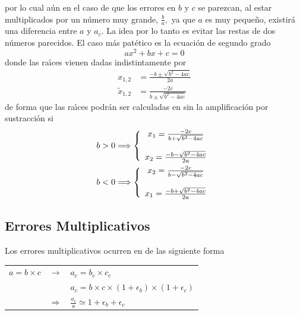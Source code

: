 \documentclass[spanish,titlepage,11pt]{article}
\begin{document}
por lo cual a\'{u}n en el caso de que los errores en $b$ y $c$ se parezcan, al
estar multiplicados por un n\'{u}mero muy grande, $\frac{b}{a},$ ya que $a $
es muy peque\~{n}o, existir\'{a} una diferencia entre $a$ y $a_{c}.$ La idea
por lo tanto es evitar las restas de dos n\'{u}meros parecidos. El caso
m\'{a}s pat\'{e}tico es la ecuaci\'{o}n de segundo grado
\begin{equation}
ax^{2}+bx+c=0
\end{equation}
donde las ra\'{\i}ces vienen dadas indistintamente por
\begin{align}
x_{1,2}  &  =\frac{-b\pm\sqrt{b^{2}-4ac}}{2a}\label{sintilde}\\
\tilde{x}_{1,2}  &  =\frac{-2c}{b\pm\sqrt{b^{2}-4ac}} \label{contilde}%
\end{align}
de forma que las ra\'{\i}ces podr\'{a}n ser calculadas en sin la
amplificaci\'{o}n por sustracci\'{o}n si
\begin{align}
b  &  >0\Longrightarrow\left\{
\begin{array}
[c]{c}%
x_{1}=\frac{-2c}{b+\sqrt{b^{2}-4ac}}\\
\\
x_{2}=\frac{-b-\sqrt{b^{2}-4ac}}{2a}%
\end{array}
\right. \\
b  &  <0\Longrightarrow\left\{
\begin{array}
[c]{c}%
x_{2}=\frac{-2c}{b-\sqrt{b^{2}-4ac}}\\
\\
x_{1}=\frac{-b+\sqrt{b^{2}-4ac}}{2a}%
\end{array}
\right.
\end{align}

\subsection{Errores Multiplicativos}

Los errores multiplicativos ocurren en de las siguiente forma

\begin{center}%
\begin{tabular}
[c]{lll}%
$a=b\times c$ & $\longrightarrow$ & $a_{c}=b_{c}\times c_{c}$\\
&  & $a_{c}=b\times c\times\left(  1+\epsilon_{b}\right)  \times\left(
1+\epsilon_{c}\right)  $\\
& $\Longrightarrow$ & $\frac{a_{c}}{a}\simeq1+\epsilon_{b}+\epsilon_{c}$%
\end{tabular}
\end{center}
\end{document}
